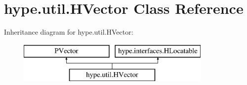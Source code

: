 \hypertarget{classhype_1_1util_1_1_h_vector}{\section{hype.\-util.\-H\-Vector Class Reference}
\label{classhype_1_1util_1_1_h_vector}
}
Inheritance diagram for hype.\-util.\-H\-Vector\-:\begin{figure}[H]
\begin{center}
\leavevmode
\includegraphics[height=2.000000cm]{classhype_1_1util_1_1_h_vector}
\end{center}
\end{figure}
